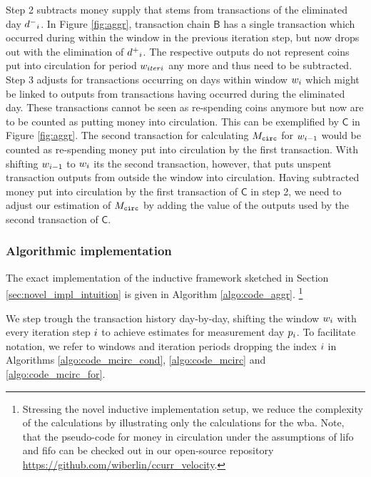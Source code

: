 Step 2 subtracts money supply that stems from transactions of the eliminated day \({d^{-}}_{{i}}\). %
In Figure \ref{fig:aggr}, transaction chain \(\mathsf{B}\) has a single transaction which occurred during within the window in the previous iteration step, but now drops out with the elimination of \({d^{+}}_{{i}}\). %
The respective outputs do not represent coins put into circulation for period \({w}_{iteri}\) any more and thus need to be subtracted. %
Step 3 adjusts for transactions occurring on days within window \({w}_{i}\) which might be linked to outputs from transactions having occurred during the eliminated day. %
These transactions cannot be seen as re-spending coins anymore but now are to be counted as putting money into circulation. %
This can be exemplified by \(\mathsf{C}\) in Figure \ref{fig:aggr}. %
The second transaction for calculating \({M_{\mathtt{circ}}}\) for \({w}_{{i}-1}\) would be counted as re-spending money put into circulation by the first transaction. %
With shifting \({w}_{{i}-1}\) to \({w}_{{i}}\) its the second transaction, however, that puts unspent transaction outputs from outside the window into circulation. %
Having subtracted money put into circulation by the first transaction of \(\mathsf{C}\) in step 2, we need to adjust our estimation of \({M_{\mathtt{circ}}}\) by adding the value of the outputs used by the second transaction of \(\mathsf{C}\). %



\subsubsection{Algorithmic implementation}
\label{sec:novel_impl_algo}%
The exact implementation of the inductive framework sketched in Section \ref{sec:novel_impl_intuition} is given in Algorithm \ref{algo:code_aggr}. %
\footnote{Stressing the novel inductive implementation setup, we reduce the complexity of the calculations by illustrating only the calculations for the \ac{wba}. %
Note, that the pseudo-code for money in circulation under the assumptions of \ac{lifo} and \ac{fifo} can be checked out in our open-source repository \url{https://github.com/wiberlin/ccurr_velocity}.
} %

We step trough the transaction history day-by-day, shifting the window \({w}_{{i}}\) with every iteration step \({i}\) to achieve estimates for measurement day \({p}_{{i}}\). %
To facilitate notation, we refer to windows and iteration periods dropping the index \({i}\) in Algorithms \ref{algo:code_mcirc_cond}, \ref{algo:code_mcirc} and \ref{algo:code_mcirc_for}. %

